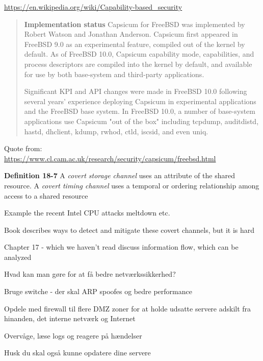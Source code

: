 \documentclass[Screen16to9,17pt]{foils}
\begin{document}
\url{https://en.wikipedia.org/wiki/Capability-based_security}


\begin{quote}{\bf
Implementation status}
Capsicum for FreeBSD was implemented by Robert Watson and Jonathan Anderson. Capsicum first appeared in FreeBSD 9.0 as an experimental feature, compiled out of the kernel by default. As of FreeBSD 10.0, Capsicum capability mode, capabilities, and process descriptors are compiled into the kernel by default, and available for use by both base-system and third-party applications.

Significant KPI and API changes were made in FreeBSD 10.0 following several years' experience deploying Capsicum in experimental applications and the FreeBSD base system. In FreeBSD 10.0, a number of base-system applications use Capsicum "out of the box" including tcpdump, auditdistd, hastd, dhclient, kdump, rwhod, ctld, iscsid, and even uniq.
\end{quote}

Quote from:\\
\url{https://www.cl.cam.ac.uk/research/security/capsicum/freebsd.html}



\begin{list1}
\item {\bf Definition 18-7} A \emph{covert storage channel} uses an attribute of the shared resource. A \emph{covert timing channel} uses a temporal or ordering relationship among access to a shared resource
\item Example the recent Intel CPU attacks meltdown etc.
\item Book describes ways to detect and mitigate these covert channels, but it is hard
\item Chapter 17 - which we haven't read discuss information flow, which can be analyzed
\end{list1}






\begin{list1}
\item Hvad kan man gøre for at få bedre netværkssikkerhed?
\begin{list2}
\item Bruge switche - der skal ARP spoofes og bedre performance
\item Opdele med firewall til flere DMZ zoner for at holde
      udsatte servere adskilt fra hinanden, det interne netværk og
      Internet
\item Overvåge, læse logs og reagere på hændelser
\end{list2}
\item Husk du skal også kunne opdatere dine servere
\end{list1}
\end{document}

